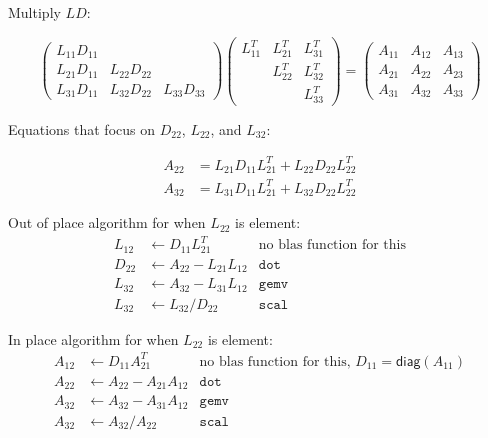 \documentclass[12pt]{article}
\begin{document}
Multiply $LD$:

\begin{equation*}
\begin{pmatrix}
L_{11} D_{11} &               &              \\
L_{21} D_{11} & L_{22} D_{22} &              \\
L_{31} D_{11} & L_{32} D_{22} & L_{33} D_{33}
\end{pmatrix}
\begin{pmatrix}
L_{11}^T & L_{21}^T & L_{31}^T \\
         & L_{22}^T & L_{32}^T \\
         &          & L_{33}^T
\end{pmatrix}
= 
\begin{pmatrix}
A_{11} & A_{12} & A_{13} \\
A_{21} & A_{22} & A_{23} \\
A_{31} & A_{32} & A_{33}
\end{pmatrix}
\end{equation*}

Equations that focus on $D_{22}$, $L_{22}$, and $L_{32}$:

\begin{align*}
A_{22} &= L_{21}D_{11}L_{21}^T + L_{22}D_{22}L_{22}^T \\
A_{32} &= L_{31}D_{11}L_{21}^T + L_{32}D_{22}L_{22}^T
\end{align*}

Out of place algorithm for when $L_{22}$ is element:
\begin{align*}
L_{12} & \gets D_{11}L_{21}^T        & \text{no blas function for this} \\
D_{22} & \gets A_{22} - L_{21}L_{12} & \texttt{dot} \\
L_{32} & \gets A_{32} - L_{31}L_{12} & \texttt{gemv} \\
L_{32} & \gets L_{32} / D_{22}       & \texttt{scal}
\end{align*}

In place algorithm for when $L_{22}$ is element:
\begin{align*}
A_{12} & \gets D_{11}A_{21}^T        & \text{no blas function for this, $D_{11}=\mathsf{diag}(A_{11})$} \\
A_{22} & \gets A_{22} - A_{21}A_{12} & \texttt{dot} \\
A_{32} & \gets A_{32} - A_{31}A_{12} & \texttt{gemv} \\
A_{32} & \gets A_{32} / A_{22}       & \texttt{scal}
\end{align*}
\end{document}
